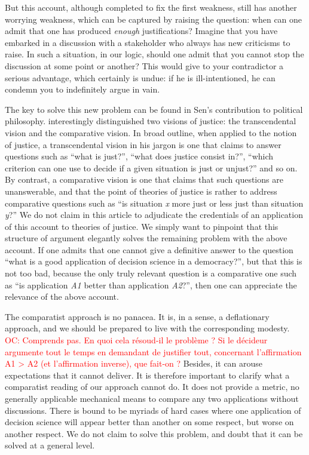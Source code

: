 \documentclass[preprint, french, english, 11pt]{elsarticle}%
\newcommand{\commentOC}[1]{\textcolor{red}{OC: #1}}
\begin{document}
But this account, although completed to fix the first weakness, still has another worrying weakness, which can be captured by raising the question: when can one admit that one has produced \emph{enough} justifications? Imagine that you have embarked in a discussion with a stakeholder who always has new criticisms to raise. In such a situation, in our logic, should one admit that you cannot stop the discussion at some point or another? This would give to your contradictor a serious advantage, which certainly is undue: if he is ill-intentioned, he can condemn you to indefinitely argue in vain.

The key to solve this new problem can be found in Sen's contribution to political philosophy. \cite{sen_idea_2009} interestingly distinguished two visions of justice: the transcendental vision and the comparative vision. In broad outline, when applied to the notion of justice, a transcendental vision in his jargon is one that claims to answer questions such as ``what is just?'', ``what does justice consist in?'', ``which criterion can one use to decide if a given situation is just or unjust?'' and so on. By contrast, a comparative vision is one that claims that such questions are unanswerable, and that the point of theories of justice is rather to address comparative questions such as ``is situation \emph{x} more just or less just than situation \emph{y}?'' We do not claim in this article to adjudicate the credentials of an application of this account to theories of justice. We simply want to pinpoint that this structure of argument elegantly solves the remaining problem with the above account. If one admits that one cannot give a definitive answer to the question ``what is a good application of decision science in a democracy?'', but that this is not too bad, because the only truly relevant question is a comparative one such as ``is application \emph{A1} better than application \emph{A2}?'', then one can appreciate the relevance of the above account.

The comparatist approach is no panacea. It is, in a sense, a deflationary approach, and we should be prepared to live with the corresponding modesty. 
\commentOC{Comprends pas. En quoi cela résoud-il le problème ? Si le décideur argumente tout le temps en demandant de justifier tout, concernant l’affirmation A1 > A2 (et l’affirmation inverse), que fait-on ?}
Besides, it can arouse expectations that it cannot deliver. It is therefore important to clarify what a comparatist reading of our approach cannot do. It does not provide a metric, no generally applicable mechanical means to compare any two applications without discussions. There is bound to be myriads of hard cases where one application of decision science will appear better than another on some respect, but worse on another respect. We do not claim to solve this problem, and doubt that it can be solved at a general level.
\end{document}
